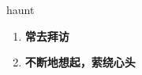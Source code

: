 
\begin{frame}
{\huge haunt}
\begin{center}
\begin{enumerate}\Large
  \item \textbf{常去拜访}
  \item \textbf{不断地想起，萦绕心头}
\end{enumerate}
\end{center}
\end{frame}
